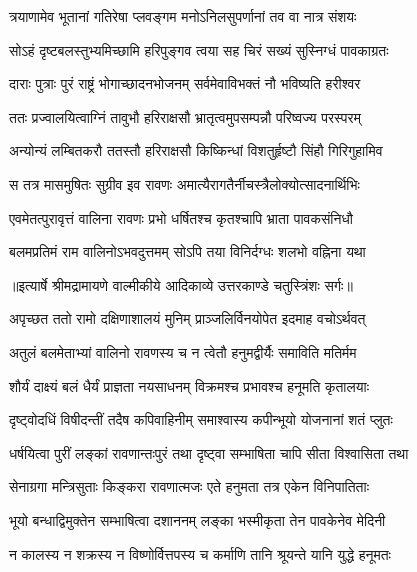 \twolineshloka
{त्रयाणामेव भूतानां गतिरेषा प्लवङ्गम}
{मनोऽनिलसुपर्णानां तव वा नात्र संशयः} %

\twolineshloka
{सोऽहं दृष्टबलस्तुभ्यमिच्छामि हरिपुङ्गव}
{त्वया सह चिरं सख्यं सुस्निग्धं पावकाग्रतः} %

\twolineshloka
{दाराः पुत्राः पुरं राष्ट्रं भोगाच्छादनभोजनम्}
{सर्वमेवाविभक्तं नौ भविष्यति हरीश्वर} %

\twolineshloka
{ततः प्रज्वालयित्वाग्निं तावुभौ हरिराक्षसौ}
{भ्रातृत्वमुपसम्पन्नौ परिष्वज्य परस्परम्} %

\twolineshloka
{अन्योन्यं लम्बितकरौ ततस्तौ हरिराक्षसौ}
{किष्किन्धां विशतुर्हृष्टौ सिंहौ गिरिगुहामिव} %

\twolineshloka
{स तत्र मासमुषितः सुग्रीव इव रावणः}
{अमात्यैरागतैर्नीचस्त्रैलोक्योत्सादनार्थिभिः} %

\twolineshloka
{एवमेतत्पुरावृत्तं वालिना रावणः प्रभो}
{धर्षितश्च कृतश्चापि भ्राता पावकसंनिधौ} %

\twolineshloka
{बलमप्रतिमं राम वालिनोऽभवदुत्तमम्}
{सोऽपि तया विनिर्दग्धः शलभो वह्निना यथा} %


{॥इत्यार्षे श्रीमद्रामायणे वाल्मीकीये आदिकाव्ये उत्तरकाण्डे चतुस्त्रिंशः सर्गः॥}


\twolineshloka
{अपृच्छत ततो रामो दक्षिणाशालयं मुनिम्}
{प्राञ्जलिर्विनयोपेत इदमाह वचोऽर्थवत्} %

\twolineshloka
{अतुलं बलमेताभ्यां वालिनो रावणस्य च}
{न त्वेतौ हनुमद्वीर्यैः समाविति मतिर्मम} %

\twolineshloka
{शौर्यं दाक्ष्यं बलं धैर्यं प्राज्ञता नयसाधनम्}
{विक्रमश्च प्रभावश्च हनूमति कृतालयाः} %

\twolineshloka
{दृष्ट्वोदधिं विषीदन्तीं तदैष कपिवाहिनीम्}
{समाश्वास्य कपीन्भूयो योजनानां शतं प्लुतः} %

\twolineshloka
{धर्षयित्वा पुरीं लङ्कां रावणान्तःपुरं तथा}
{दृष्ट्वा सम्भाषिता चापि सीता विश्वासिता तथा} %

\twolineshloka
{सेनाग्रगा मन्त्रिसुताः किङ्करा रावणात्मजः}
{एते हनुमता तत्र एकेन विनिपातिताः} %

\twolineshloka
{भूयो बन्धाद्विमुक्तेन सम्भाषित्वा दशाननम्}
{लङ्का भस्मीकृता तेन पावकेनेव मेदिनी} %

\twolineshloka
{न कालस्य न शक्रस्य न विष्णोर्वित्तपस्य च}
{कर्माणि तानि श्रूयन्ते यानि युद्धे हनूमतः} %

